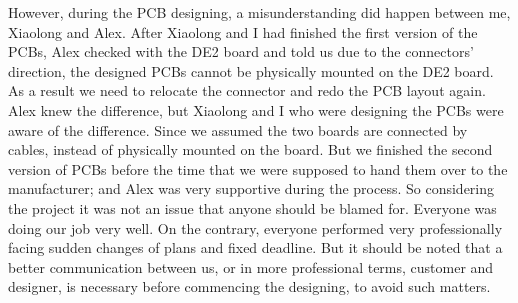 However, during the PCB designing, a misunderstanding did happen between me, Xiaolong and Alex. After Xiaolong and I had finished the first version of the PCBs, Alex checked with the DE2 board and told us due to the connectors’ direction, the designed PCBs cannot be physically mounted on the DE2 board. As a result we need to relocate the connector and redo the PCB layout again. Alex knew the difference, but Xiaolong and I who were designing the PCBs were aware of the difference. Since we assumed the two boards are connected by cables, instead of physically mounted on the board. But we finished the second version of PCBs before the time that we were supposed to hand them over to the manufacturer; and Alex was very supportive during the process. So considering the project it was not an issue that anyone should be blamed for. Everyone was doing our job very well. On the contrary, everyone performed very professionally facing sudden changes of plans and fixed deadline. But it should be noted that a better communication between us, or in more professional terms, customer and designer, is necessary before commencing the designing, to avoid such matters.


















